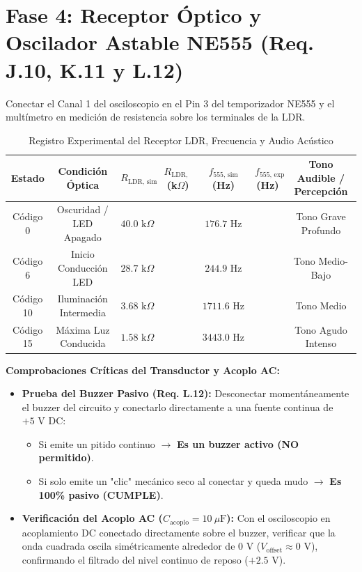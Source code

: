 \documentclass[10pt,a4paper]{article}
\newcommand{\cmark}{\textcolor{okgreen}{\ding{51}}}
\newcommand{\xmark}{\textcolor{alertred}{\ding{55}}}
\newcommand{\squarebox}{\raisebox{-0.1ex}{\Large $\square$}}
\begin{document}
\section{Fase 4: Receptor Óptico y Oscilador Astable NE555 (Req. J.10, K.11 y L.12)}

Conectar el Canal 1 del osciloscopio en el Pin 3 del temporizador NE555 y el multímetro en medición de resistencia sobre los terminales de la LDR.

\begin{table}[h!]
\centering
\caption{Registro Experimental del Receptor LDR, Frecuencia y Audio Acústico}
\label{tab:555_exp}
\footnotesize
\setlength{\tabcolsep}{4.5pt}
\renewcommand{\arraystretch}{1.15}
\begin{tabular}{ccccccc}
\toprule
\textbf{Estado} & \textbf{Condición Óptica} & $R_{\text{LDR, sim}}$ & $R_{\text{LDR, exp}}$ \textbf{(k$\Omega$)} & $f_{\text{555, sim}}$ \textbf{(Hz)} & $f_{\text{555, exp}}$ \textbf{(Hz)} & \textbf{Tono Audible / Percepción} \\
\midrule
Código 0  & Oscuridad / LED Apagado & $40.0\text{ k}\Omega$ & & $176.7\text{ Hz}$ & & Tono Grave Profundo \\
Código 6  & Inicio Conducción LED   & $28.7\text{ k}\Omega$ & & $244.9\text{ Hz}$ & & Tono Medio-Bajo \\
Código 10 & Iluminación Intermedia  & $3.68\text{ k}\Omega$ & & $1711.6\text{ Hz}$ & & Tono Medio \\
Código 15 & Máxima Luz Conducida    & $1.58\text{ k}\Omega$ & & $3443.0\text{ Hz}$ & & Tono Agudo Intenso \\
\bottomrule
\end{tabular}
\end{table}

\noindent\textbf{Comprobaciones Críticas del Transductor y Acoplo AC:}
\begin{itemize}[label=\squarebox]
    \item \textbf{Prueba del Buzzer Pasivo (Req. L.12):} Desconectar momentáneamente el buzzer del circuito y conectarlo directamente a una fuente continua de $+5\text{ V}$ DC:
    \begin{itemize}
        \item Si emite un pitido continuo $\to$ \xmark{} \textbf{Es un buzzer activo (NO permitido)}.
        \item Si solo emite un "clic" mecánico seco al conectar y queda mudo $\to$ \cmark{} \textbf{Es 100\% pasivo (CUMPLE)}.
    \end{itemize}
    \item \textbf{Verificación del Acoplo AC ($C_{\text{acoplo}} = 10\ \mu\text{F}$):} Con el osciloscopio en acoplamiento DC conectado directamente sobre el buzzer, verificar que la onda cuadrada oscila simétricamente alrededor de $0\text{ V}$ ($V_{\text{offset}} \approx 0\text{ V}$), confirmando el filtrado del nivel continuo de reposo ($+2.5\text{ V}$).
\end{itemize}
\end{document}
